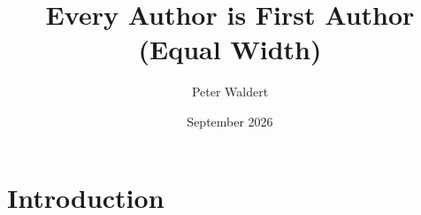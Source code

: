 \documentclass{article}
\title{Every Author is First Author (Equal Width)}
\author{Peter Waldert}
\date{September 2026}
\begin{document}
\maketitle

\section{Introduction}
\end{document}
